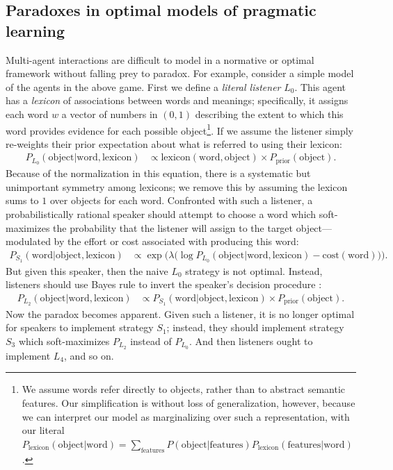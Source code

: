\documentclass{article} %
\newcommand{\word}{\text{word}}
\newcommand{\obj}{\text{object}}
\newcommand{\lex}{\text{lexicon}}
\newcommand{\prior}{P_{\text{prior}}(\obj)}
\begin{document}
\subsection{Paradoxes in optimal models of pragmatic learning}
Multi-agent interactions are difficult to model in a normative or
optimal framework without falling prey to paradox. For example,
consider a simple model of the agents in the above game. First we
define a \textit{literal listener} $L_0$. This agent has a
\textit{lexicon} of associations between words and meanings;
specifically, it assigns each word $w$ a vector of numbers in $(0, 1)$ describing the extent
to which this word provides evidence for each possible object\footnote{We
  assume words refer directly to objects, rather than to abstract
  semantic features. Our simplification is without loss of
  generalization, however, because we can interpret our model as
  marginalizing over such a representation, with our literal
  $P_\lex(\obj | \word) = \sum_\text{features} P(\obj |
  \text{features}) P_\lex(\text{features} | \word)$.}.%
If we assume the listener simply re-weights their prior expectation   
about what is referred to using their lexicon:
\begin{align*}
P_{L_0}(\obj | \word, \lex) &\propto \lex(\word, \obj) \times \prior.
\end{align*}
Because of the normalization in this equation, there is a systematic but unimportant symmetry among lexicons; we 
remove this by assuming the lexicon sums to $1$ over objects for each word.
Confronted with such a listener, a probabilistically rational speaker
should attempt to choose a word which soft-maximizes the probability
that the listener will assign to the target object---modulated by the
effort or cost associated with producing this word:
\begin{align*}
P_{S_1}(\word | \obj, \lex) &\propto \exp\Big(\lambda \big(\log P_{L_0}(\obj | \word, \lex) - \text{cost}(\word)\big)\Big).
\end{align*}
But given this speaker, then the naive $L_0$ strategy is not
optimal. Instead, listeners should use Bayes rule to invert the
speaker's decision procedure \cite{frank2012}:
\begin{align*}
P_{L_2}(\obj | \word, \lex) &\propto P_{S_1}(\word | \obj, \lex) \times \prior.
\end{align*}
Now the paradox becomes apparent. Given such a listener, it is no
longer optimal for speakers to implement strategy $S_1$; instead, they
should implement strategy $S_3$ which soft-maximizes $P_{L_2}$ instead
of $P_{L_0}$. And then listeners ought to implement $L_4$, and so on.
\end{document}
